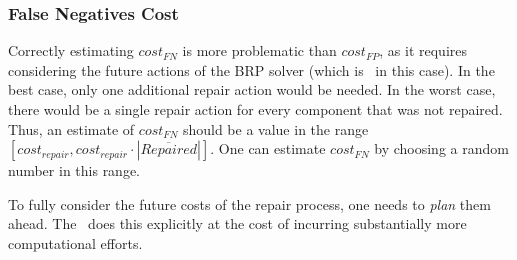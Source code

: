 \subsubsection{False Negatives Cost}
Correctly estimating $cost_{FN}$ is more problematic than $cost_{FP}$, as it requires considering the future actions of the BRP solver (which is \myopic\ in this case). 
In the best case, only one additional repair action would be needed. In the worst case, there would be a single repair action for every component that was not repaired. Thus, an estimate of $cost_{FN}$ should be a value in the range $[cost_{repair},cost_{repair}\cdot |\overline{Repaired}|]$.
One can estimate $cost_{FN}$ by choosing a random number in this range.



To fully consider the future costs of the repair process, one needs to {\em plan} them ahead. The \planbased\ does this explicitly at the cost of incurring substantially more computational efforts.